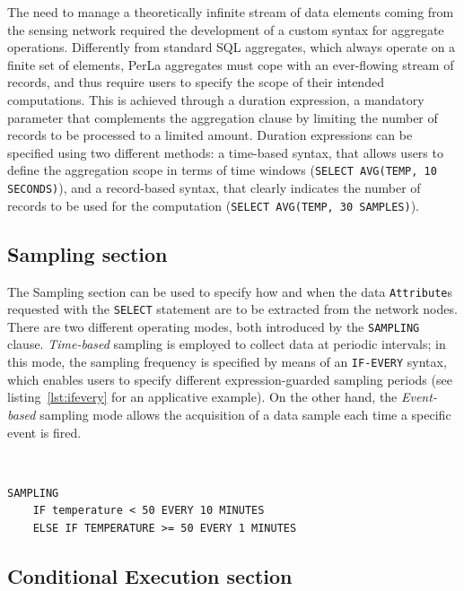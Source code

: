 The need to manage a theoretically infinite stream of data elements coming from
the sensing network required the development of a custom syntax for aggregate
operations. Differently from standard SQL aggregates, which always operate on a
finite set of elements, PerLa aggregates must cope with an ever-flowing stream
of records, and thus require users to specify the scope of their intended
computations. This is achieved through a duration expression, a mandatory
parameter that complements the aggregation clause by limiting the number of
records to be processed to a limited amount. Duration expressions can be
specified using two different methods: a time-based syntax, that allows users
to define the aggregation scope in terms of time windows (\lstinline!SELECT AVG(TEMP, 10 SECONDS)!),
and a record-based syntax, that clearly indicates the
number of records to be used for the computation (\lstinline!SELECT AVG(TEMP, 30 SAMPLES)!).

\subsection{Sampling section}

The Sampling section can be used to specify how and when the data
\texttt{Attribute}s requested with the \texttt{SELECT} statement are to be
extracted from the network nodes. There are two different operating modes, both
introduced by the \texttt{SAMPLING} clause. \textit{Time-based} sampling is
employed to collect data at periodic intervals; in this mode, the sampling
frequency is specified by means of an \texttt{IF-EVERY} syntax, which enables
users to specify different expression-guarded sampling periods (see
listing~\ref{lst:ifevery} for an applicative example). On the other hand, the
\textit{Event-based} sampling mode allows the acquisition of a data sample each
time a specific event is fired.

~\\
\begin{lstlisting}[label={lst:ifevery},caption={An example of time-based sampling, which shows how
the sampling frequency can be increased as the monitored phenomenon evolves.}]
SAMPLING
    IF temperature < 50 EVERY 10 MINUTES
    ELSE IF TEMPERATURE >= 50 EVERY 1 MINUTES
\end{lstlisting}

\subsection{Conditional Execution section}

